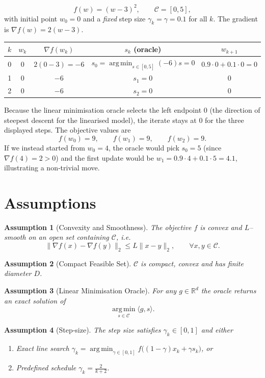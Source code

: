 \documentclass{article}
\newtheorem{assumption}{Assumption}
\newcommand{\argmin}{\operatorname*{arg\,min}}
\begin{document}
\[
f(w) = (w-3)^2 ,\qquad \mathcal C = [0,5],
\]
with initial point $w_0=0$ and a \emph{fixed} step size $\gamma_k=\gamma=0.1$ for all $k$.
The gradient is $\nabla f(w)=2(w-3)$.

\begin{center}
\begin{tabular}{c|c|c|c|c}
$k$ & $w_k$ & $\nabla f(w_k)$ & $s_k$ (oracle) & $w_{k+1}$\\ \hline
0 & $0$ & $2(0-3)=-6$ & $\displaystyle s_0=\argmin_{s\in[0,5]}(-6)s =0$ & $0.9\cdot0+0.1\cdot0=0$ \\[4pt]
1 & $0$ & $-6$ & $s_1=0$ & $0$ \\[4pt]
2 & $0$ & $-6$ & $s_2=0$ & $0$ 
\end{tabular}
\end{center}

Because the linear minimisation oracle selects the left endpoint $0$ (the direction of steepest descent for the linearised model), the iterate stays at $0$ for the three displayed steps. The objective values are
\[
f(w_0)=9,\qquad f(w_1)=9,\qquad f(w_2)=9 .
\]
If we instead started from $w_0=4$, the oracle would pick $s_0=5$ (since $\nabla f(4)=2>0$) and the first update would be $w_1=0.9\cdot4+0.1\cdot5=4.1$, illustrating a non‑trivial move.

\section*{Assumptions}
\begin{assumption}[Convexity and Smoothness]\label{as:convex-smooth}
The objective $f$ is convex and $L$–smooth on an open set containing $\mathcal C$, i.e.
\[
\|\nabla f(x)-\nabla f(y)\|_2\le L\|x-y\|_2,\qquad\forall x,y\in\mathcal C .
\]
\end{assumption}
\begin{assumption}[Compact Feasible Set]\label{as:compact}
$\mathcal C$ is compact, convex and has finite diameter $D$.
\end{assumption}
\begin{assumption}[Linear Minimisation Oracle]\label{as:oracle}
For any $g\in\mathbb R^d$ the oracle returns an exact solution of 
\[
\argmin_{s\in\mathcal C}\langle g,s\rangle .
\]
\end{assumption}
\begin{assumption}[Step‑size]\label{as:stepsize}
The step size satisfies $\gamma_k\in[0,1]$ and either
\begin{enumerate}[label=(\alph*)]
\item \emph{Exact line search} $\displaystyle\gamma_k=\argmin_{\gamma\in[0,1]}f\bigl((1-\gamma)x_k+\gamma s_k\bigr)$, or
\item \emph{Predefined schedule} $\displaystyle\gamma_k=\frac{2}{k+2}$.
\end{enumerate}
\end{assumption}
\end{document}

